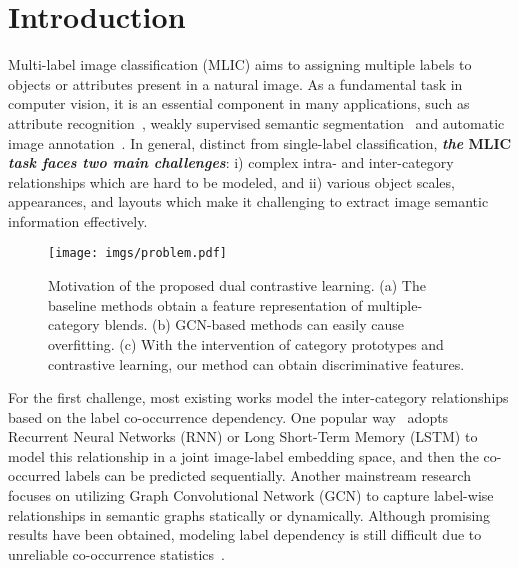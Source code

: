 \documentclass{ecai}
\begin{document}
\section{Introduction}
Multi-label image classification (MLIC) aims to assigning multiple labels to objects or attributes present in a natural image. As a fundamental task in computer vision, it is an essential component in many applications, such as attribute recognition~\cite{Yang2020CVPR}, weakly supervised semantic segmentation~\cite{Ru2022CVPR} and automatic image annotation~\cite{Jing2016Annotation}. In general, distinct from single-label classification, \textbf{\emph{the} MLIC \emph{task faces two main challenges}}: i) complex intra- and inter-category relationships which are hard to be modeled, and ii) various object scales, appearances, and layouts which make it challenging to extract image semantic information effectively.

\begin{figure}[t]
	\begin{center}
		\texttt{[image: imgs/problem.pdf]}
		\vspace{-0.6cm}
		\caption{Motivation of the proposed dual contrastive learning. 
			(a) The baseline methods obtain a feature representation of multiple-category blends. 
			(b) GCN-based methods can easily cause overfitting.
			(c) With the intervention of category prototypes and contrastive learning, our method can obtain discriminative features.
		}
		\label{fig1}
	\end{center}
	\vspace{-0.6cm}
\end{figure}

For the first challenge, most existing works model the inter-category relationships based on the label co-occurrence dependency. One popular way~\cite{wang2016cnn,Wang2017ICCV} adopts Recurrent Neural Networks (RNN) or Long Short-Term Memory (LSTM) to model this relationship in a joint image-label embedding space, and then the co-occurred labels can be predicted sequentially.   Another mainstream research~\cite{chen2021learning,ye2020attention} focuses on utilizing Graph Convolutional Network (GCN) to capture label-wise relationships in semantic graphs statically or dynamically. Although promising results have been obtained, modeling label dependency is still difficult due to unreliable co-occurrence statistics~\cite{zhu2021residual}.
\end{document}
